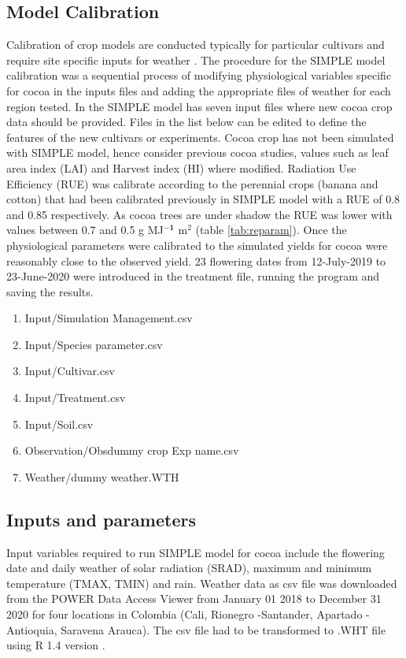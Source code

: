 \documentclass[gene,journal,article,submit,moreauthors,pdftex]{Definitions/mdpi}
\begin{document}
\subsection{Model Calibration}

Calibration of crop models are conducted typically for particular cultivars and require site specific inputs for weather \citep{Crout20142}. The procedure for the SIMPLE model \citep{Zao2019simple} calibration  was a sequential process of modifying physiological variables specific for cocoa in the inputs files and  adding the appropriate files of weather for each region tested. In the SIMPLE model has seven input files where new cocoa crop data should be provided. Files in the list below can be edited to define the features of the new cultivars or experiments. Cocoa crop has not been simulated with SIMPLE model, hence consider previous cocoa studies, values such as leaf area index (LAI) \citep{Agele2016} and Harvest index (HI) \citep{Quintana2015} where modified. Radiation Use Efficiency (RUE) was calibrate according to the perennial crops  (banana and cotton) that had been calibrated previously in SIMPLE model \citep{Zao2019simple} with a RUE of 0.8 and 0.85 respectively. As cocoa trees are under shadow the RUE was lower with values between 0.7 and 0.5 g MJ$^{\mathbf{-1}}$ m$^{2}$ (table \ref{tab:reparam}).
Once the physiological parameters were calibrated to the  simulated yields for cocoa were reasonably close to the observed yield. 23 flowering dates from 12-July-2019 to 23-June-2020 were introduced in the treatment file, running the program and saving the results.  

\begin{enumerate}
	\item Input/Simulation Management.csv
	\item Input/Species parameter.csv
	\item Input/Cultivar.csv
	\item Input/Treatment.csv	
	\item Input/Soil.csv
	\item Observation/Obsdummy crop Exp name.csv	
	\item Weather/dummy weather.WTH
\end{enumerate}


\subsection{Inputs and parameters}
Input variables required to run SIMPLE model for cocoa include the flowering date and daily weather of solar radiation (SRAD), maximum and minimum temperature (TMAX, TMIN) and rain. Weather data as csv file was  downloaded from the POWER Data Access Viewer \citep{nasapower} from January 01 2018 to December 31 2020 for four locations in Colombia (Cali, Rionegro -Santander, Apartado - Antioquia, Saravena Arauca). The csv file had to be transformed to .WHT file using R 1.4 version \citep{Rstudio2020}. 
\end{document}

